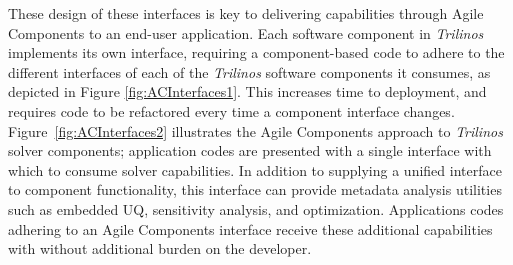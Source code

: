 \documentclass[10pt]{article}
\theoremstyle{plain}
\theoremstyle{definition}
\theoremstyle{remark}
\numberwithin{equation}{section}
\begin{document}
These design of these interfaces is key to delivering capabilities through Agile Components to an end-user application. Each software component in \emph{Trilinos} implements its own interface, requiring a component-based code to adhere to the different interfaces of each of the \emph{Trilinos} software components it consumes, as depicted in Figure \ref{fig:ACInterfaces1}.  This increases time to deployment, and requires code to be refactored every time a component interface changes.   Figure~\ref{fig:ACInterfaces2} illustrates the Agile Components approach to \emph{Trilinos} solver components; application codes are presented with a single interface with which to consume solver capabilities.  In addition to supplying a unified interface to component functionality, this interface can provide metadata analysis utilities such as embedded UQ, sensitivity analysis, and optimization.  Applications codes adhering to an Agile Components interface receive these additional capabilities with without additional burden on the developer.
\end{document}
